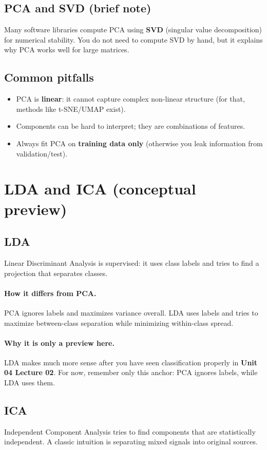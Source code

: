 \documentclass[11pt]{article}
\begin{document}
\subsection{PCA and SVD (brief note)}
Many software libraries compute PCA using \textbf{SVD} (singular value decomposition) for numerical stability.
You do not need to compute SVD by hand, but it explains why PCA works well for large matrices.

\subsection{Common pitfalls}
\begin{itemize}[leftmargin=*]
  \item PCA is \textbf{linear}: it cannot capture complex non-linear structure (for that, methods like t-SNE/UMAP exist).
  \item Components can be hard to interpret; they are combinations of features.
  \item Always fit PCA on \textbf{training data only} (otherwise you leak information from validation/test).
\end{itemize}

\section{LDA and ICA (conceptual preview)}
\subsection{LDA}
Linear Discriminant Analysis is supervised: it uses class labels and tries to find a projection that separates classes.
\paragraph{How it differs from PCA.}
PCA ignores labels and maximizes variance overall.
LDA uses labels and tries to maximize between-class separation while minimizing within-class spread.
\paragraph{Why it is only a preview here.}
LDA makes much more sense after you have seen classification properly in \textbf{Unit 04 Lecture 02}. For now, remember only this anchor: PCA ignores labels, while LDA uses them.

\subsection{ICA}
Independent Component Analysis tries to find components that are statistically independent. A classic intuition is separating mixed signals into original sources.
\end{document}
